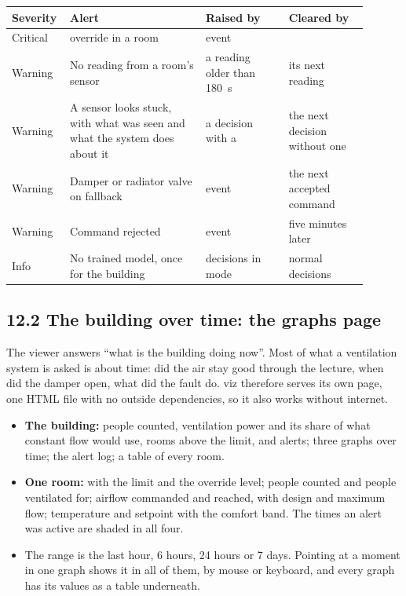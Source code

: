 \begin{longtable}[]{@{}L{0.11\linewidth}L{0.36\linewidth}L{0.22\linewidth}L{0.21\linewidth}@{}}
\toprule
\textbf{Severity} & \textbf{Alert} & \textbf{Raised by} & \textbf{Cleared by} \\
\midrule
\endhead
Critical & \COtwo{} override in a room & event  &  \\
Warning & No reading from a room's sensor & a reading older than 180~s & its next reading \\
Warning & A sensor looks stuck, with what was seen and what the system does about it & a decision with a  & the next decision without one \\
Warning & Damper or radiator valve on fallback & event  & the next accepted command \\
Warning & Command rejected & event  & five minutes later \\
Info & No trained model, once for the building & decisions in mode  & normal decisions \\
\bottomrule
\end{longtable}


\subsection{12.2 The building over time: the graphs page}

The viewer answers ``what is the building doing now''. Most of what a
ventilation system is asked is about time: did the air stay good through the
lecture, when did the damper open, what did the fault do. viz therefore serves
its own page, one HTML file with no outside dependencies, so it also works
without internet.

\begin{itemize}
\tightlist
\item \textbf{The building:} people counted, ventilation power and its share
  of what constant flow would use, rooms above the \COtwo{} limit, and alerts;
  three graphs over time; the alert log; a table of every room.
\item \textbf{One room:} \COtwo{} with the limit and the override level; people
  counted and people ventilated for; airflow commanded and reached, with design
  and maximum flow; temperature and setpoint with the comfort band. The times
  an alert was active are shaded in all four.
\item The range is the last hour, 6 hours, 24 hours or 7 days. Pointing at a
  moment in one graph shows it in all of them, by mouse or keyboard, and every
  graph has its values as a table underneath.
\end{itemize}

